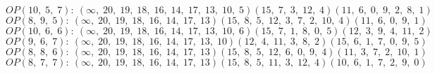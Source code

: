 $OP(10, \;5, \;7): \:(\infty, \;20, \;19, \;18, \;16, \;14, \;17, \;13, \;10, \;5)(15, \;7, \;3, \;12, \;4)(11, \;6, \;0, \;9, \;2, \;8, \;1)$\\
$OP(8, \;9, \;5): \:(\infty, \;20, \;19, \;18, \;16, \;14, \;17, \;13)(15, \;8, \;5, \;12, \;3, \;7, \;2, \;10, \;4)(11, \;6, \;0, \;9, \;1)$\\
$OP(10, \;6, \;6): \:(\infty, \;20, \;19, \;18, \;16, \;14, \;17, \;13, \;10, \;6)(15, \;7, \;1, \;8, \;0, \;5)(12, \;3, \;9, \;4, \;11, \;2)$\\
$OP(9, \;6, \;7): \:(\infty, \;20, \;19, \;18, \;16, \;14, \;17, \;13, \;10)(12, \;4, \;11, \;3, \;8, \;2)(15, \;6, \;1, \;7, \;0, \;9, \;5)$\\
$OP(8, \;8, \;6): \:(\infty, \;20, \;19, \;18, \;16, \;14, \;17, \;13)(15, \;8, \;5, \;12, \;6, \;0, \;9, \;4)(11, \;3, \;7, \;2, \;10, \;1)$\\
$OP(8, \;7, \;7): \:(\infty, \;20, \;19, \;18, \;16, \;14, \;17, \;13)(15, \;8, \;5, \;11, \;3, \;12, \;4)(10, \;6, \;1, \;7, \;2, \;9, \;0)$\\

